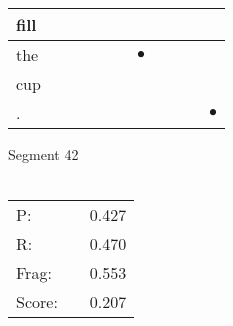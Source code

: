 \documentclass[landscape]{article}
\newcommand{\ssp}{\hspace{2pt}}
\newcommand{\mex}{\cellcolor{g}$\bullet$}
\begin{document}
\begin{tabular}{|l|p{10pt}|p{10pt}|p{10pt}|p{10pt}|p{10pt}|p{10pt}|p{10pt}|p{10pt}|p{10pt}|p{10pt}|}
\hline
\ssp fill \ssp&\hspace{2pt}&\hspace{2pt}&\hspace{2pt}&\hspace{2pt}&\hspace{2pt}&\hspace{2pt}&\hspace{2pt}&\hspace{2pt}&\hspace{2pt}&\hspace{2pt}\\
\hline
\ssp \cellcolor{ref5}the \ssp&\hspace{2pt}&\hspace{2pt}&\hspace{2pt}&\hspace{2pt}&\hspace{2pt}&\hspace{2pt}\mex&\hspace{2pt}&\hspace{2pt}&\hspace{2pt}&\hspace{2pt}\\
\hline
\ssp cup \ssp&\hspace{2pt}&\hspace{2pt}&\hspace{2pt}&\hspace{2pt}&\hspace{2pt}&\hspace{2pt}&\hspace{2pt}&\hspace{2pt}&\hspace{2pt}&\hspace{2pt}\\
\hline
\ssp \cellcolor{ref9}. \ssp&\hspace{2pt}&\hspace{2pt}&\hspace{2pt}&\hspace{2pt}&\hspace{2pt}&\hspace{2pt}&\hspace{2pt}&\hspace{2pt}&\hspace{2pt}&\hspace{2pt}\mex\\
\hline
\end{tabular}

\vspace{6pt}
\noindent Segment 42\\\\
\noindent\begin{tabular}{lm{12pt}r}
\hline
P:&&0.427\\
R:&&0.470\\
Frag:&&0.553\\
Score:&&0.207\\
\end{tabular}
\end{document}
